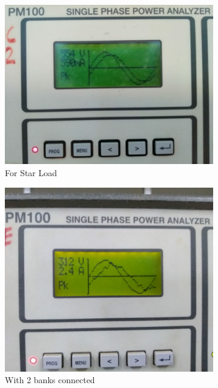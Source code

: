\documentclass[12pt]{article}
\begin{document}
       \begin{figure}[H]
       
          \begin{subfigure}{0.3\linewidth}
               \centering
               \includegraphics[width = \linewidth]{LAB-1/star.jpeg}
               \caption{For Star Load}
          \end{subfigure}
          \begin{subfigure}{0.3\linewidth}
               \centering
               \includegraphics[width = 0.85\linewidth]{LAB-1/2 bank.jpeg}
               \caption{With 2 banks connected}
          \end{subfigure} 
          \begin{subfigure}{0.3\linewidth}

\end{subfigure}
\end{figure}
\end{document}
